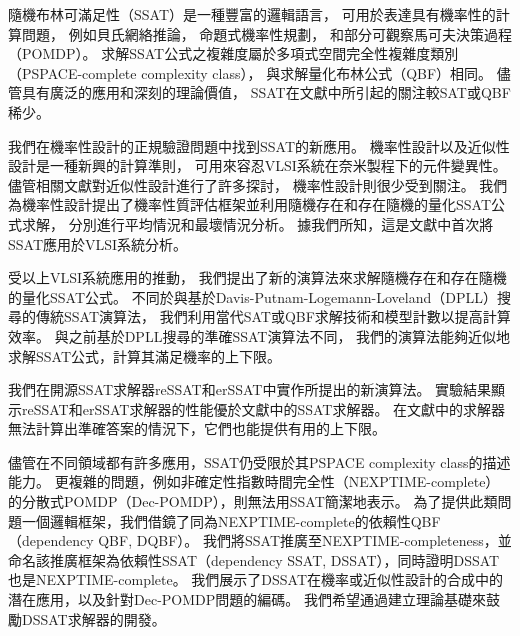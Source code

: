 
隨機布林可滿足性（SSAT）是一種豐富的邏輯語言，
可用於表達具有機率性的計算問題，
例如貝氏網絡推論，
命題式機率性規劃，
和部分可觀察馬可夫決策過程（POMDP）。
求解SSAT公式之複雜度屬於多項式空間完全性複雜度類別（PSPACE-complete complexity class），
與求解量化布林公式（QBF）相同。
儘管具有廣泛的應用和深刻的理論價值，
SSAT在文獻中所引起的關注較SAT或QBF稀少。

我們在機率性設計的正規驗證問題中找到SSAT的新應用。
機率性設計以及近似性設計是一種新興的計算準則，
可用來容忍VLSI系統在奈米製程下的元件變異性。
儘管相關文獻對近似性設計進行了許多探討，
機率性設計則很少受到關注。
我們為機率性設計提出了機率性質評估框架並利用隨機存在和存在隨機的量化SSAT公式求解，
分別進行平均情況和最壞情況分析。
據我們所知，這是文獻中首次將SSAT應用於VLSI系統分析。

受以上VLSI系統應用的推動，
我們提出了新的演算法來求解隨機存在和存在隨機的量化SSAT公式。
不同於與基於Davis-Putnam-Logemann-Loveland（DPLL）搜尋的傳統SSAT演算法，
我們利用當代SAT或QBF求解技術和模型計數以提高計算效率。
與之前基於DPLL搜尋的準確SSAT演算法不同，
我們的演算法能夠近似地求解SSAT公式，計算其滿足機率的上下限。

我們在開源SSAT求解器reSSAT和erSSAT中實作所提出的新演算法。
實驗結果顯示reSSAT和erSSAT求解器的性能優於文獻中的SSAT求解器。
在文獻中的求解器無法計算出準確答案的情況下，它們也能提供有用的上下限。

儘管在不同領域都有許多應用，SSAT仍受限於其PSPACE complexity class的描述能力。
更複雜的問題，例如非確定性指數時間完全性（NEXPTIME-complete）的分散式POMDP（Dec-POMDP），則無法用SSAT簡潔地表示。
為了提供此類問題一個邏輯框架，我們借鏡了同為NEXPTIME-complete的依賴性QBF（dependency QBF, DQBF）。
我們將SSAT推廣至NEXPTIME-completeness，並命名該推廣框架為依賴性SSAT（dependency SSAT, DSSAT），同時證明DSSAT也是NEXPTIME-complete。
我們展示了DSSAT在機率或近似性設計的合成中的潛在應用，以及針對Dec-POMDP問題的編碼。
我們希望通過建立理論基礎來鼓勵DSSAT求解器的開發。